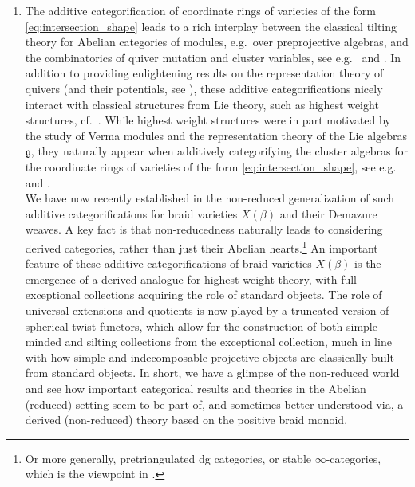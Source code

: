 \begin{enumerate}
\item The additive categorification of coordinate rings of varieties of the form \eqref{eq:intersection_shape} leads to a rich interplay between the classical tilting theory for Abelian categories of modules, e.g.~over preprojective algebras, and the combinatorics of quiver mutation and cluster variables, see e.g.~\cite{MR2242628,GLS08,GeissLeclercSchroer2013QuantumCoordinate,MR3534832} and \cite{JKS2016,BKM2016,MR3694688,MR4662273,MR4456104,MR2844757}. In addition to providing enlightening results on the representation theory of quivers (and their potentials, see \cite{DWZ08,DWZ10_2}), these additive categorifications nicely interact with classical structures from Lie theory, such as highest weight structures, cf.~\cite{CPS88,Kra17,BS24}. While highest weight structures were in part motivated by the study of Verma modules and the representation theory of the Lie algebras $\mathfrak{g}$, they naturally appear when additively categorifying the cluster algebras for the coordinate rings of varieties of the form \eqref{eq:intersection_shape}, see e.g.~\cite{IR11} and \cite{MR2242628,GLS08,BIRS09}.\\

We have now recently established in \cite{CasalsChrist} the non-reduced generalization of such additive categorifications for braid varieties $X(\beta)$ and their Demazure weaves. A key fact is that non-reducedness naturally leads to considering derived categories, rather than just their Abelian hearts.\footnote{Or more generally, pretriangulated dg categories, or stable $\infty$-categories, which is the viewpoint in \cite{CasalsChrist}.} An important feature of these additive categorifications of braid varieties $X(\beta)$ is the emergence of a derived analogue for highest weight theory, with full exceptional collections acquiring the role of standard objects. The role of universal extensions and quotients is now played by a truncated version of spherical twist functors, which allow for the construction of both simple-minded and silting collections from the exceptional collection, much in line with how simple and indecomposable projective objects are classically built from standard objects. In short, we have a glimpse of the non-reduced world and see how important categorical results and theories in the Abelian (reduced) setting seem to be part of, and sometimes better understood via, a derived (non-reduced) theory based on the positive braid monoid.\\


\end{enumerate}
